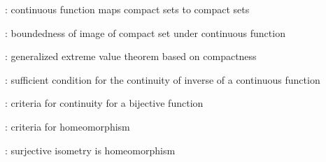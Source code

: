 \item {}: continuous function maps compact sets to compact sets
\item {}: boundedness of image of compact set under continuous function
\item {}: generalized extreme value theorem based on compactness
\item {}: sufficient condition for the continuity of
inverse of a continuous function
\item {}: criteria for continuity for a bijective function
\item {}: criteria for homeomorphism
\item {}: surjective isometry is homeomorphism
